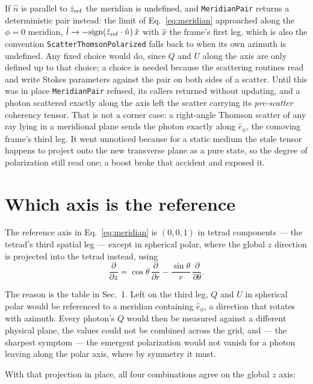 \documentclass[11pt]{article}
\newcommand{\zref}{\hat{z}_{\rm ref}}
\newcommand{\lhat}{\hat{l}}
\newcommand{\nhat}{\hat{n}}
\begin{document}
If $\nhat$ is parallel to $\zref$ the meridian is undefined, and \texttt{MeridianPair}
returns a deterministic pair instead: the limit of Eq.~\eqref{eq:meridian} approached along
the $\phi = 0$ meridian, $\lhat \to -\mathrm{sign}(\zref\cdot\nhat)\,\hat{x}$ with $\hat{x}$
the frame's first leg, which is also the convention \texttt{ScatterThomsonPolarized} falls
back to when its own azimuth is undefined. Any fixed choice would do, since $Q$ and $U$
along the axis are only defined up to that choice; a choice is needed because the
scattering routines read and write Stokes parameters against the pair on both sides of a
scatter. Until this was in place \texttt{MeridianPair} refused, its callers returned without
updating, and a photon scattered exactly along the axis left the scatter carrying its
\emph{pre-scatter} coherency tensor. That is not a corner case: a right-angle Thomson scatter
of any ray lying in a meridional plane sends the photon exactly along $\hat{e}_\phi$, the
comoving frame's third leg. It went unnoticed because for a static medium the stale tensor
happens to project onto the new transverse plane as a pure state, so the degree of
polarization still read one; a boost broke that accident and exposed it.

\section{Which axis is the reference}

The reference axis in Eq.~\eqref{eq:meridian} is $(0,0,1)$ in tetrad components --- the
tetrad's third spatial leg --- except in spherical polar, where the global $z$ direction is
projected into the tetrad instead, using
\begin{equation}
  \frac{\partial}{\partial z} = \cos\theta \, \frac{\partial}{\partial r}
                              - \frac{\sin\theta}{r} \, \frac{\partial}{\partial \theta} .
\end{equation}

The reason is the table in Sec.~1. Left on the third leg, $Q$ and $U$ in spherical polar
would be referenced to a meridian containing $\hat{e}_\phi$, a direction that rotates with
azimuth. Every photon's $Q$ would then be measured against a different physical plane, the
values could not be combined across the grid, and --- the sharpest symptom --- the emergent
polarization would not vanish for a photon leaving along the polar axis, where by symmetry it
must.

With that projection in place, all four combinations agree on the global $z$ axis:
\end{document}

